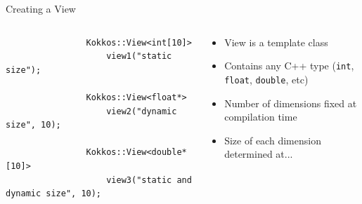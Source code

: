\documentclass[aspectratio=169]{beamer}
\begin{document}
\begin{frame}[fragile]{Creating a View}
    \begin{columns}
        \begin{column}{0.6\linewidth}
            \begin{verbatim}
                Kokkos::View<int[10]>
                    view1("static size");

                Kokkos::View<float*>
                    view2("dynamic size", 10);

                Kokkos::View<double*[10]>
                    view3("static and dynamic size", 10);
            \end{verbatim}
        \end{column}
        \begin{column}{0.4\linewidth}
            \begin{itemize}
                \item View is a template class
                \item Contains any C++ type (\texttt{int}, \texttt{float}, \texttt{double}, etc)
                \item Number of dimensions fixed at compilation time
                \item Size of each dimension determined at...
            \end{itemize}
        \end{column}
    \end{columns}
\end{frame}

\end{document}
